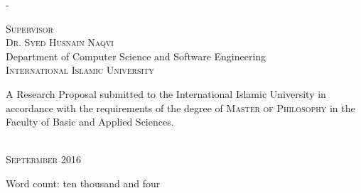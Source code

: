 \begin{titlingpage}
\begin{SingleSpace}
\begin{adjustwidth*}{\unitlength}{-\unitlength}
\begin{center}
\vspace{6mm}
{\large\textsc{Supervisor \\
				Dr. Syed Husnain Naqvi}}\\
\vspace{6mm}
{\large Department of Computer Science and Software Engineering\\
\textsc{International Islamic University}}\\
\vspace{11mm}
\begin{minipage}{10cm}
A Research Proposal submitted to the International Islamic University in accordance with the requirements of the degree of \textsc{Master of Philosophy} in the Faculty of Basic and Applied Sciences.
\end{minipage}\\
\vspace{9mm}
{\large\textsc{Septermber 2016}}
\vspace{12mm}
\end{center}
\begin{flushright}
{\small Word count: ten thousand and four}
\end{flushright}
\end{adjustwidth*}
\end{SingleSpace}
\end{titlingpage}